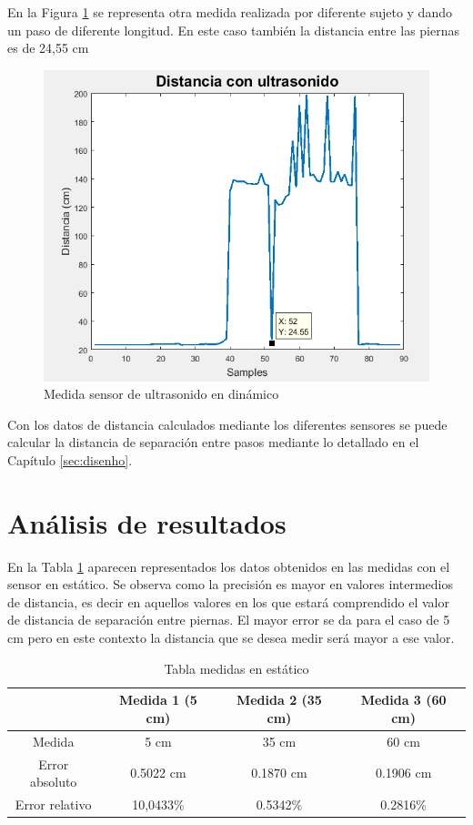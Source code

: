 En la Figura \ref{fig:ultrasonido_corto2} se representa otra medida realizada por diferente sujeto y dando un paso de diferente longitud. En este caso también la distancia entre las piernas es de 24,55 cm

\begin{figure}[H]
	\centering
	\includegraphics[width=16 cm,height=9 cm]{./graphics/dinam2}
	\caption{Medida sensor de ultrasonido en dinámico} \label{fig:ultrasonido_corto2}
	
\end{figure}

Con los datos de distancia calculados mediante los diferentes sensores se puede calcular la distancia de separación entre pasos mediante lo detallado en el Capítulo \ref{sec:disenho}.


\section{Análisis de resultados}

En la Tabla \ref{tabla:medidas 43 cm} aparecen representados los datos obtenidos en las medidas con el sensor en estático. Se observa como la precisión es mayor en valores intermedios de distancia, es decir en aquellos valores en los que estará comprendido el valor de distancia de separación entre piernas. El mayor error se da para el caso de 5 cm pero en este contexto la distancia que se desea medir será mayor a ese valor.


\begin{table}[H]
	\centering
	\begin{tabular}[t]{|c|c|c|c| }
		\hline
		& Medida 1 (5 cm) & Medida 2 (35 cm) & Medida 3 (60 cm) \\
		\hline
		Medida  & 5 cm   & 35 cm  & 60 cm  \\
		\hline
		Error absoluto  & 0.5022 cm &  0.1870 cm  &  0.1906 cm \\ 
		\hline
		Error relativo  & 10,0433\% &  0.5342\%  &  0.2816\% \\ 
		\hline
	\end{tabular}
	\caption{Tabla medidas en estático}
	\label{tabla:medidas 43 cm}
\end{table}

